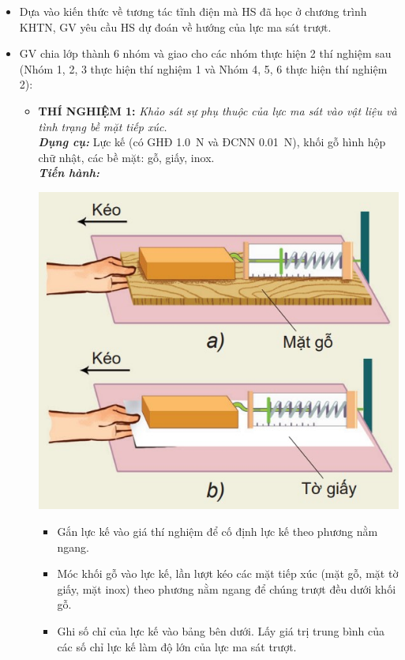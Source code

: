 {\begin{itemize}[label=-]
\begin{center}
		\end{center}
		\item Dựa vào kiến thức về tương tác tĩnh điện mà HS đã học ở chương trình KHTN, GV yêu cầu HS dự đoán về hướng của lực ma sát trượt.
		\item GV chia lớp thành 6 nhóm và giao cho các nhóm thực hiện 2 thí nghiệm sau (Nhóm 1, 2, 3 thực hiện thí nghiệm 1 và Nhóm 4, 5, 6 thực hiện thí nghiệm 2):
		\begin{itemize}[label=$\bullet$]
			\item \textbf{THÍ NGHIỆM 1:} \textit{Khảo sát sự phụ thuộc của lực ma sát vào vật liệu và tình trạng bề mặt tiếp xúc.}\\
			\textbf{\textit{Dụng cụ:}} Lực kế (có GHĐ \SI{1.0}{\newton} và ĐCNN \SI{0.01}{\newton}), khối gỗ hình hộp chữ nhật, các bề mặt: gỗ, giấy, inox.\\
			\textbf{\textit{Tiến hành:}}
			\begin{center}
				\includegraphics[scale=0.7]{figs/G10-BAI11-4.jpg}
			\end{center}
			\begin{itemize}
				\item Gắn lực kế vào giá thí nghiệm để cố định lực kế theo phương nằm ngang.
				\item Móc khối gỗ vào lực kế, lần lượt kéo các mặt tiếp xúc (mặt gỗ, mặt tờ giấy, mặt inox) theo phương nằm ngang để chúng trượt đều dưới khối gỗ.
				\item Ghi số chỉ của lực kế vào bảng bên dưới. Lấy giá trị trung bình của các số chỉ lực kế làm độ lớn của lực ma sát trượt.

\end{itemize}
\end{itemize}
\end{itemize}}
